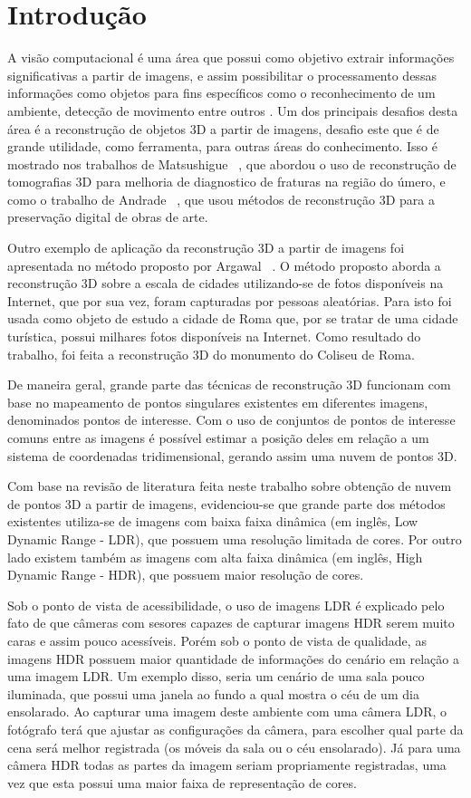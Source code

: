 \chapter{Introdução} \label{introducao}
A visão computacional é uma área que possui como objetivo extrair informações significativas a partir de imagens, e assim possibilitar o processamento dessas informações como objetos para fins específicos como o reconhecimento de um ambiente, detecção de movimento entre outros \cite{ballard&brown}. Um dos principais desafios desta área é a reconstrução de objetos 3D a partir de imagens, desafio este que é de grande utilidade, como ferramenta, para outras áreas do conhecimento. Isso é mostrado nos trabalhos de Matsushigue \etal~\cite{matsushigue}, que abordou o uso de reconstrução de tomografias 3D para melhoria de diagnostico de fraturas na região do úmero, e como o trabalho de Andrade \etal~\cite{beatriz}, que usou métodos de reconstrução 3D para a preservação digital de obras de arte.


Outro exemplo de aplicação da reconstrução 3D a partir de imagens foi apresentada no método proposto por Argawal \etal~\cite{agarwal}. O método proposto aborda a reconstrução 3D sobre a escala de cidades utilizando-se de fotos disponíveis na Internet, que por sua vez, foram capturadas por pessoas aleatórias. Para isto foi usada como objeto de estudo a cidade de Roma que, por se tratar de uma cidade turística, possui milhares fotos disponíveis na Internet. Como resultado do trabalho, foi feita a reconstrução 3D do monumento do Coliseu de Roma.


De maneira geral, grande parte das técnicas de reconstrução 3D funcionam com base no mapeamento de pontos singulares existentes em diferentes imagens, denominados pontos de interesse. Com o uso de conjuntos de pontos de interesse comuns entre as imagens é possível estimar a posição deles em relação a um sistema de coordenadas tridimensional, gerando assim uma nuvem de pontos 3D.


Com base na revisão de literatura feita neste trabalho sobre obtenção de nuvem de pontos 3D a partir de imagens, evidenciou-se que grande parte dos métodos existentes utiliza-se de imagens com baixa faixa dinâmica (em inglês, Low Dynamic Range - LDR), que possuem uma resolução limitada de cores. Por outro lado existem também as imagens com alta faixa dinâmica (em inglês, High Dynamic Range - HDR), que possuem maior resolução de cores.

Sob o ponto de vista de acessibilidade, o uso de imagens LDR é explicado pelo fato de que câmeras com sesores capazes de capturar imagens HDR serem muito caras e assim pouco acessíveis. Porém sob o ponto de vista de qualidade, as imagens HDR possuem maior quantidade de informações do cenário em relação a uma imagem LDR. Um exemplo disso, seria um cenário de uma sala pouco iluminada, que possui uma janela ao fundo a qual mostra o céu de um dia ensolarado. Ao capturar uma imagem deste ambiente com uma câmera LDR, o fotógrafo terá que ajustar as configurações da câmera, para escolher qual parte da cena será melhor registrada (os móveis da sala ou o céu ensolarado). Já para uma câmera HDR todas as partes da imagem seriam propriamente registradas, uma vez que esta possui uma maior faixa de representação de cores.


